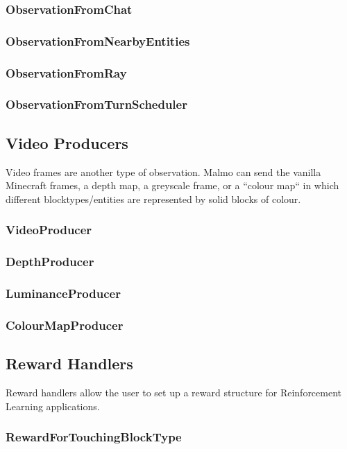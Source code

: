 \documentclass[11pt]{article} %
\begin{document}
\subsubsection{ObservationFromChat}
\subsubsection{ObservationFromNearbyEntities}
\subsubsection{ObservationFromRay}
\subsubsection{ObservationFromTurnScheduler}

\subsection{Video Producers}
Video frames are another type of observation. Malmo can send the vanilla Minecraft frames, a depth map, a greyscale frame, or a ``colour map`` in which different blocktypes/entities are represented by solid blocks of colour.

\subsubsection{VideoProducer}
\subsubsection{DepthProducer}
\subsubsection{LuminanceProducer}
\subsubsection{ColourMapProducer}

\subsection{Reward Handlers}
Reward handlers allow the user to set up a reward structure for Reinforcement Learning applications.

\subsubsection{RewardForTouchingBlockType}
\end{document}
